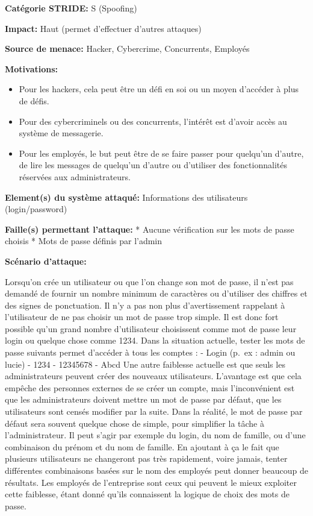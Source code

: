 \documentclass{article}
\begin{document}
\textbf{Catégorie STRIDE:} S (Spoofing)

\textbf{Impact:} Haut (permet d'effectuer d'autres attaques)

\textbf{Source de menace:} Hacker, Cybercrime, Concurrents, Employés

\textbf{Motivations:}

\begin{itemize}
\tightlist
\item
  Pour les hackers, cela peut être un défi en soi ou un moyen d'accéder
  à plus de défis.
\item
  Pour des cybercriminels ou des concurrents, l'intérêt est d'avoir
  accès au système de messagerie.
\item
  Pour les employés, le but peut être de se faire passer pour quelqu'un
  d'autre, de lire les messages de quelqu'un d'autre ou d'utiliser des
  fonctionnalités réservées aux administrateurs.
\end{itemize}

\textbf{Element(s) du système attaqué:} Informations des utilisateurs
(login/password)

\textbf{Faille(s) permettant l'attaque:} * Aucune vérification sur les
mots de passe choisis * Mots de passe définis par l'admin

\textbf{Scénario d'attaque:}

Lorsqu'on crée un utilisateur ou que l'on change son mot de passe, il
n'est pas demandé de fournir un nombre minimum de caractères ou
d'utiliser des chiffres et des signes de ponctuation. Il n'y a pas non
plus d'avertissement rappelant à l'utilisateur de ne pas choisir un mot
de passe trop simple. Il est donc fort possible qu'un grand nombre
d'utilisateur choisissent comme mot de passe leur login ou quelque chose
comme 1234. Dans la situation actuelle, tester les mots de passe
suivants permet d'accéder à tous les comptes : - Login (p.~ex : admin ou
lucie) - 1234 - 12345678 - Abcd Une autre faiblesse actuelle est que
seuls les administrateurs peuvent créer des nouveaux utilisateurs.
L'avantage est que cela empêche des personnes externes de se créer un
compte, mais l'inconvénient est que les administrateurs doivent mettre
un mot de passe par défaut, que les utilisateurs sont censés modifier
par la suite. Dans la réalité, le mot de passe par défaut sera souvent
quelque chose de simple, pour simplifier la tâche à l'administrateur. Il
peut s'agir par exemple du login, du nom de famille, ou d'une
combinaison du prénom et du nom de famille. En ajoutant à ça le fait que
plusieurs utilisateurs ne changeront pas très rapidement, voire jamais,
tenter différentes combinaisons basées sur le nom des employés peut
donner beaucoup de résultats. Les employés de l'entreprise sont ceux qui
peuvent le mieux exploiter cette faiblesse, étant donné qu'ils
connaissent la logique de choix des mots de passe.
\end{document}
